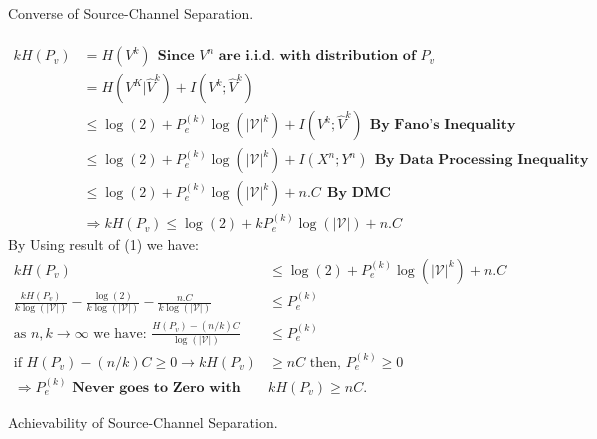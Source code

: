 \documentclass[
  course = {{EE623 Information Theory}},
  quartile = {{Fall 2020}},
  assignment = 9,
  name = {{Mohammad Mahdi Rahimi}},
  studentnumber = {{20208244}},
  email = {{mahi@kaist.ac.kr}},
  firstexercise = 1
]{aga-homework}
\begin{document}
\exercise
\subexercise Converse of Source-Channel Separation.
\\\\
\begin{equation} \label{eq1}
\begin{split}
kH(P_v) & = H(V^k)\ \ \textbf{Since $V^n$ are i.i.d. with distribution of $P_v$}\\
& = H(V^K|\hat{V}^k) + I(V^k;\hat{V}^k)\\
& \le \log(2) + P^{(k)}_e \log(|\mathcal{V}|^k) + I(V^k;\hat{V}^k)\ \ \textbf{By Fano's Inequality} \\
& \le \log(2) + P^{(k)}_e \log(|\mathcal{V}|^k) + I(X^n;Y^n)\ \ \textbf{By Data Processing Inequality} \\
& \le \log(2) + P^{(k)}_e \log(|\mathcal{V}|^k) + n.C\ \ \textbf{By DMC} \\
& \Rightarrow kH(P_v) \le  \log(2) + kP^{(k)}_e \log(|\mathcal{V}|) + n.C
\end{split}
\end{equation}
By Using result of (1) we have:
\begin{equation} \label{eq2}
\begin{split}
kH(P_v) &\le \log(2) + P^{(k)}_e \log(|\mathcal{V}|^k) + n.C \\
\frac{kH(P_v)}{k\log(|\mathcal{V}|)} - \frac{\log(2)}{k\log(|\mathcal{V}|)} - \frac{n.C}{k\log(|\mathcal{V}|)} & \le P^{(k)}_e \\
\text{as $n, k \rightarrow \infty$ we have: }  \frac{H(P_v) - (n/k)C}{\log(|\mathcal{V}|)} & \le P^{(k)}_e \\
\text{if } H(P_v) - (n/k)C \ge 0 \rightarrow kH(P_v)& \ge nC \text{ then, } P^{(k)}_e \ge 0 \\
\Rightarrow P^{(k)}_e\textbf{ Never goes to Zero with }& kH(P_v) \ge nC.
\end{split}
\end{equation}

\subexercise Achievability of Source-Channel Separation.
\\\\
\end{document}
